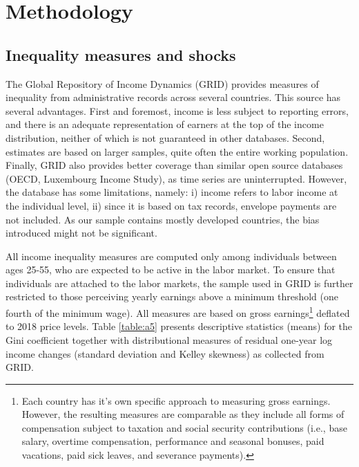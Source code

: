 \documentclass[12pt, a4paper]{article}
\begin{document}

\section{Methodology}

\subsection{Inequality measures and shocks} 
The Global Repository of Income Dynamics (GRID) provides measures of inequality from administrative records across several countries. This source has several advantages. First and foremost, income is less subject to reporting errors, and there is an adequate representation of earners at the top of the income distribution, neither of which is not guaranteed in other databases. Second, estimates are based on larger samples, quite often the entire working population. Finally, GRID also provides better coverage than similar open source databases (OECD, Luxembourg Income Study), as time series are uninterrupted. However, the database has some limitations, namely: i) income refers to labor income at the individual level, ii) since it is based on tax records, envelope payments are not included. As our sample contains mostly developed countries, the bias introduced might not be significant.

All income inequality measures are computed only among individuals between ages 25-55, who are expected to be active in the labor market. To ensure that individuals are attached to the labor markets, the sample used in GRID is further restricted to those perceiving yearly earnings above a minimum threshold (one fourth of the minimum wage). All measures are based on gross earnings\footnote{Each country has it's own specific approach to measuring gross earnings. However, the resulting measures are comparable as they include all forms of compensation subject to taxation and social security contributions (i.e., base salary, overtime compensation, performance and seasonal bonuses, paid vacations, paid sick leaves, and severance payments).} deflated to 2018 price levels. Table \ref{table:a5} presents descriptive statistics (means) for the Gini coefficient together with distributional measures of residual one-year log income changes (standard deviation and Kelley skewness) as collected from GRID.
\end{document}
